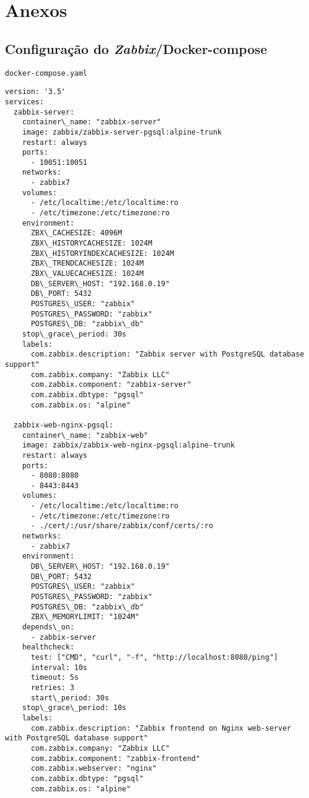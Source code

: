 \section{Anexos}\label{sec:anexos}
\subsection{Configuração do \textit{Zabbix}/Docker-compose}\label{sec:yaml}
\texttt{docker-compose.yaml}
\begin{lstlisting}
version: '3.5'
services:
  zabbix-server:
    container\_name: "zabbix-server"
    image: zabbix/zabbix-server-pgsql:alpine-trunk
    restart: always
    ports:
      - 10051:10051
    networks:
      - zabbix7
    volumes:
      - /etc/localtime:/etc/localtime:ro
      - /etc/timezone:/etc/timezone:ro 
    environment:
      ZBX\_CACHESIZE: 4096M
      ZBX\_HISTORYCACHESIZE: 1024M
      ZBX\_HISTORYINDEXCACHESIZE: 1024M
      ZBX\_TRENDCACHESIZE: 1024M
      ZBX\_VALUECACHESIZE: 1024M
      DB\_SERVER\_HOST: "192.168.0.19" 
      DB\_PORT: 5432
      POSTGRES\_USER: "zabbix"
      POSTGRES\_PASSWORD: "zabbix"
      POSTGRES\_DB: "zabbix\_db"
    stop\_grace\_period: 30s
    labels:
      com.zabbix.description: "Zabbix server with PostgreSQL database support"
      com.zabbix.company: "Zabbix LLC"
      com.zabbix.component: "zabbix-server"
      com.zabbix.dbtype: "pgsql"
      com.zabbix.os: "alpine"

  zabbix-web-nginx-pgsql:
    container\_name: "zabbix-web"
    image: zabbix/zabbix-web-nginx-pgsql:alpine-trunk
    restart: always
    ports:
      - 8080:8080
      - 8443:8443
    volumes:
      - /etc/localtime:/etc/localtime:ro
      - /etc/timezone:/etc/timezone:ro
      - ./cert/:/usr/share/zabbix/conf/certs/:ro
    networks:
      - zabbix7
    environment:
      DB\_SERVER\_HOST: "192.168.0.19"
      DB\_PORT: 5432
      POSTGRES\_USER: "zabbix"
      POSTGRES\_PASSWORD: "zabbix"
      POSTGRES\_DB: "zabbix\_db"
      ZBX\_MEMORYLIMIT: "1024M"
    depends\_on:
      - zabbix-server
    healthcheck:
      test: ["CMD", "curl", "-f", "http://localhost:8080/ping"]
      interval: 10s
      timeout: 5s
      retries: 3
      start\_period: 30s
    stop\_grace\_period: 10s
    labels:
      com.zabbix.description: "Zabbix frontend on Nginx web-server with PostgreSQL database support"
      com.zabbix.company: "Zabbix LLC"
      com.zabbix.component: "zabbix-frontend"
      com.zabbix.webserver: "nginx"
      com.zabbix.dbtype: "pgsql"
      com.zabbix.os: "alpine"


\end{lstlisting}
